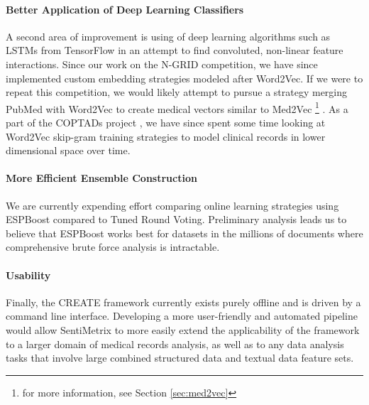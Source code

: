 \paragraph{Better Application of Deep Learning Classifiers} A second area of improvement is using of deep learning algorithms such as \textsf{LSTMs} from TensorFlow \cite{tensorflow} in an attempt to find convoluted, non-linear feature interactions. Since our work on the N-GRID competition, we have since implemented custom embedding strategies modeled after Word2Vec. If we were to repeat this competition, we would likely attempt to pursue a strategy merging PubMed with Word2Vec to create medical vectors similar to Med2Vec \footnote{for more information, see Section \ref{sec:med2vec}} \cite{med2vec}. As a part of the COPTADs project \cite{coptads}, we have since spent some time looking at Word2Vec skip-gram training strategies \cite{word2vec} to model clinical records in lower dimensional space over time.

\paragraph{More Efficient Ensemble Construction} We are currently expending effort comparing online learning strategies using \textsf{ESPBoost} \cite{espboost} compared to \textsf{Tuned Round Voting}. Preliminary analysis leads us to believe that \textsf{ESPBoost} works best for datasets in the millions of documents where comprehensive brute force analysis is intractable.

\paragraph{Usability} Finally, the CREATE framework currently exists purely offline and is driven by a command line interface. Developing a more user-friendly and automated pipeline would allow SentiMetrix to more easily extend the applicability of the framework to a larger domain of medical records
analysis, as well as to any data analysis tasks that involve large combined structured data and textual data feature sets.
